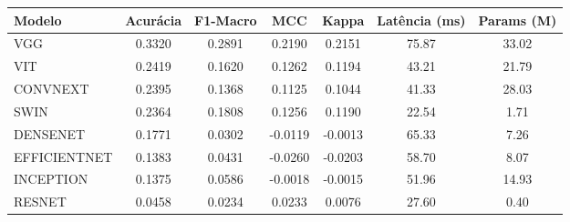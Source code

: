 \begin{table}[h]
\centering
\begin{tabular}{lcccccc}
\hline
Modelo & Acurácia & F1-Macro & MCC & Kappa & Latência (ms) & Params (M) \\ \hline
VGG & 0.3320 & 0.2891 & 0.2190 & 0.2151 & 75.87 & 33.02 \\
VIT & 0.2419 & 0.1620 & 0.1262 & 0.1194 & 43.21 & 21.79 \\
CONVNEXT & 0.2395 & 0.1368 & 0.1125 & 0.1044 & 41.33 & 28.03 \\
SWIN & 0.2364 & 0.1808 & 0.1256 & 0.1190 & 22.54 & 1.71 \\
DENSENET & 0.1771 & 0.0302 & -0.0119 & -0.0013 & 65.33 & 7.26 \\
EFFICIENTNET & 0.1383 & 0.0431 & -0.0260 & -0.0203 & 58.70 & 8.07 \\
INCEPTION & 0.1375 & 0.0586 & -0.0018 & -0.0015 & 51.96 & 14.93 \\
RESNET & 0.0458 & 0.0234 & 0.0233 & 0.0076 & 27.60 & 0.40 \\
\hline
\end{tabular}
\end{table}